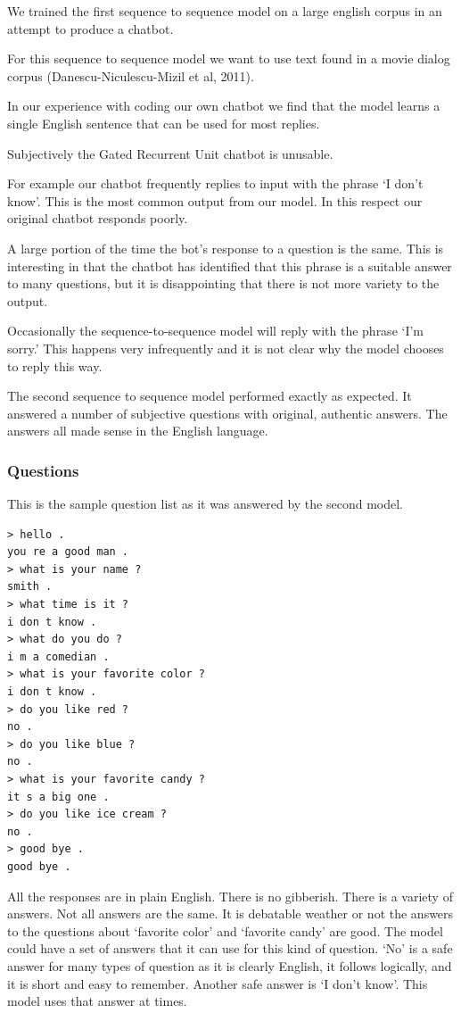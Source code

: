We trained the first sequence to sequence model on a large english
corpus in an attempt to produce a chatbot. 

For this sequence to sequence model we want to use text found in a movie dialog corpus (Danescu-Niculescu-Mizil et al, 2011)\cite{Danescu-Niculescu-Mizil+Lee:11a}. 

In our experience with coding our own chatbot we find that the model learns a single English sentence that can be used for most replies. 

Subjectively the Gated Recurrent Unit chatbot is unusable.

For example our chatbot frequently replies to input with the phrase `I don't know'. This is the most common output from our model. In this respect our original chatbot responds poorly.

A large portion of the time the bot's response to a question is the same. This is interesting in that the chatbot has identified that this phrase is a suitable answer to many questions, but it is disappointing that there is not more variety to the output.  

Occasionally the sequence-to-sequence model will reply with the phrase `I'm sorry.' This happens very infrequently and it is not clear why the model chooses to reply this way. 

The second sequence to sequence model performed exactly as expected. It answered a number of subjective questions with original, authentic answers. The answers all made sense in the English language.

\subsubsection*{Questions}
This is the sample question list as it was answered by the second model.

\begin{verbatim}
> hello .
you re a good man .
> what is your name ?
smith .
> what time is it ?
i don t know .
> what do you do ?
i m a comedian .
> what is your favorite color ?
i don t know .
> do you like red ?
no .
> do you like blue ?
no .
> what is your favorite candy ?
it s a big one .
> do you like ice cream ?
no .
> good bye .
good bye .
\end{verbatim}
 
All the responses are in plain English. There is no gibberish. There is a variety of answers. Not all answers are the same. It is debatable weather or not the answers to the questions about `favorite color' and `favorite candy' are good. The model could have a set of answers that it can use for this kind of question. `No' is a safe answer for many types of question as it is clearly English, it follows logically, and it is short and easy to remember. Another safe answer is `I don't know'. This model uses that answer at times.

